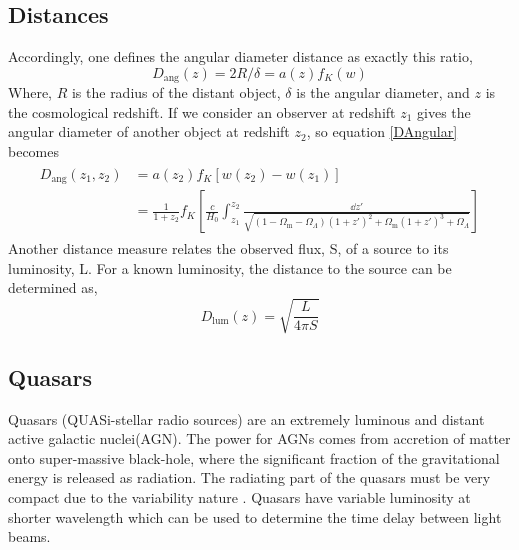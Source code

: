   \subsection{Distances}
  Accordingly, one defines the angular diameter distance as exactly this ratio,
  \begin{equation}
  	D_\text{ang}(z)=2R/\delta=a(z)f_{K}(w)
  \label{DAngular}
  \end{equation}
  \noindent
  Where, $R$ is the radius of the distant object, $\delta$ is the angular diameter, and $z$ is the cosmological redshift. If we consider an observer at redshift $ z_{1} $ gives the angular diameter of another object at redshift $ z_{2} $, so equation \ref{DAngular} becomes
  \begin{align}
	  \begin{split}
	  D_\text{ang}(z_{1},z_{2}) &=a(z_{2})f_{K}[w(z_{2}) - w(z_{1})] \\
										 &= \frac{1}{1+z_2} f_{K} \left[ \frac{c}{H_0} \int_{z_1}^{z_2} \frac{\dd{z'}}{\sqrt{(1-\Omega_\text{m}-\Omega_\Lambda)(1+z')^2 + \Omega_\text{m}(1+z')^3+\Omega_\Lambda}} \right]					
	  \end{split}
  \label{math:Dangular2}
  \end{align}
  Another distance measure relates the observed flux, S, of a source to its luminosity, L. For a known luminosity, the distance to the source can be determined as,
  \begin{equation}
  D_\text{lum}(z)=\sqrt{\frac{L}{4\pi S}}
  \end{equation}

\subsection{Quasars}
Quasars (QUASi-stellar radio sources) are an extremely luminous and distant active galactic nuclei(AGN). The power for AGNs comes from accretion of matter onto super-massive black-hole, where the significant fraction of the gravitational energy is released as radiation. The radiating part of the quasars must be very compact due to the variability nature
\cite{manual}. Quasars have variable luminosity at shorter wavelength which can be used to determine the time delay between light beams.

